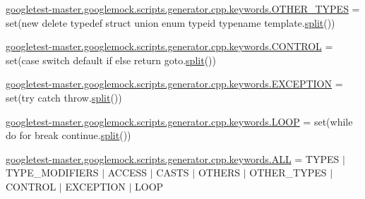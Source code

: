 \begin{DoxyCompactItemize}
\item 
\mbox{\hyperlink{namespacegoogletest-master_1_1googlemock_1_1scripts_1_1generator_1_1cpp_1_1keywords_ada82536b9102deb6c85f0f7568f5d8c5}{googletest-\/master.\+googlemock.\+scripts.\+generator.\+cpp.\+keywords.\+O\+T\+H\+E\+R\+\_\+\+T\+Y\+P\+ES}} = set(\textquotesingle{}new delete typedef struct union enum typeid typename template\textquotesingle{}.\mbox{\hyperlink{_input_8h_aec2fd8cd9140a1b535dc54a924396f40}{split}}())
\item 
\mbox{\hyperlink{namespacegoogletest-master_1_1googlemock_1_1scripts_1_1generator_1_1cpp_1_1keywords_a46038cde2b8e614ef80c7fafec0c99d0}{googletest-\/master.\+googlemock.\+scripts.\+generator.\+cpp.\+keywords.\+C\+O\+N\+T\+R\+OL}} = set(\textquotesingle{}case switch default if else return goto\textquotesingle{}.\mbox{\hyperlink{_input_8h_aec2fd8cd9140a1b535dc54a924396f40}{split}}())
\item 
\mbox{\hyperlink{namespacegoogletest-master_1_1googlemock_1_1scripts_1_1generator_1_1cpp_1_1keywords_a426b300ff6c951c08cedcbb10a71191d}{googletest-\/master.\+googlemock.\+scripts.\+generator.\+cpp.\+keywords.\+E\+X\+C\+E\+P\+T\+I\+ON}} = set(\textquotesingle{}try catch throw\textquotesingle{}.\mbox{\hyperlink{_input_8h_aec2fd8cd9140a1b535dc54a924396f40}{split}}())
\item 
\mbox{\hyperlink{namespacegoogletest-master_1_1googlemock_1_1scripts_1_1generator_1_1cpp_1_1keywords_a274647c56284c11c0aac67832bc37283}{googletest-\/master.\+googlemock.\+scripts.\+generator.\+cpp.\+keywords.\+L\+O\+OP}} = set(\textquotesingle{}while do for break continue\textquotesingle{}.\mbox{\hyperlink{_input_8h_aec2fd8cd9140a1b535dc54a924396f40}{split}}())
\item 
\mbox{\hyperlink{namespacegoogletest-master_1_1googlemock_1_1scripts_1_1generator_1_1cpp_1_1keywords_a1d3558671b5774136945cac4ecd6090d}{googletest-\/master.\+googlemock.\+scripts.\+generator.\+cpp.\+keywords.\+A\+LL}} = T\+Y\+P\+ES $\vert$ T\+Y\+P\+E\+\_\+\+M\+O\+D\+I\+F\+I\+E\+RS $\vert$ A\+C\+C\+E\+SS $\vert$ C\+A\+S\+TS $\vert$ O\+T\+H\+E\+RS $\vert$ O\+T\+H\+E\+R\+\_\+\+T\+Y\+P\+ES $\vert$ C\+O\+N\+T\+R\+OL $\vert$ E\+X\+C\+E\+P\+T\+I\+ON $\vert$ L\+O\+OP
\end{DoxyCompactItemize}
